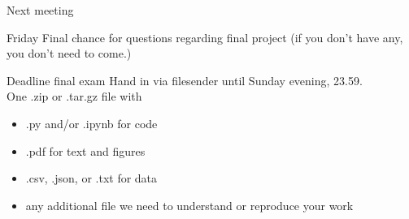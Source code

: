 \documentclass{beamer}
\begin{document}
\begin{frame}{Next meeting}
\begin{block}{Friday}
	Final chance for questions regarding final project (if you don't have any, you don't need to come.)
\end{block}

\begin{block}{Deadline final exam}
Hand in via filesender until Sunday evening, 23.59.\\
One .zip or .tar.gz file with
\begin{itemize}
	\item .py and/or .ipynb for code
	\item .pdf for text and figures
	\item .csv, .json, or .txt for data
	\item any additional file we need to understand or reproduce your work
\end{itemize}
\end{block}

\end{frame}
\end{document}
